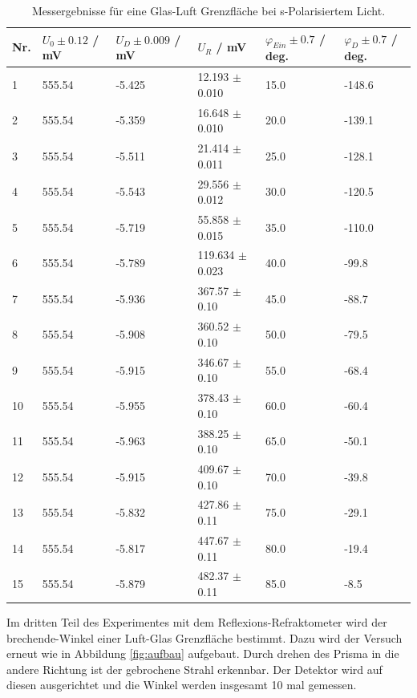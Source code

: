 \documentclass[12pt,a4paper,twoside]{article}
\begin{document}
\begin{table}[H]
    \centering
    \caption{Messergebnisse für eine Glas-Luft Grenzfläche bei s-Polarisiertem Licht. }
    \label{tab:mess glas luft s-pol}
    \begin{tabular}{| l | l | l | l | l | l |}
        \hline
        Nr. & $U_0 \pm 0.12 $ / mV & $U_D \pm 0.009$ / mV & $U_{R}$ / mV & $\varphi_{Ein} \pm 0.7$ / deg. & $\varphi_D \pm 0.7$ / deg.  \\
        \hline
        1  & 555.54 & -5.425 & 12.193  $\pm$ 0.010 & 15.0  & -148.6 \\
        2  & 555.54 & -5.359 & 16.648  $\pm$ 0.010& 20.0  & -139.1 \\
        3  & 555.54 & -5.511 & 21.414  $\pm$ 0.011 & 25.0  & -128.1 \\
        4  & 555.54 & -5.543 & 29.556  $\pm$ 0.012 & 30.0  & -120.5 \\
        5  & 555.54 & -5.719 & 55.858  $\pm$ 0.015 & 35.0  & -110.0 \\
        6  & 555.54 & -5.789 & 119.634 $\pm$ 0.023 & 40.0  & -99.8  \\
        7  & 555.54 & -5.936 & 367.57  $\pm$ 0.10 & 45.0  & -88.7  \\
        8  & 555.54 & -5.908 & 360.52  $\pm$ 0.10 & 50.0  & -79.5  \\
        9  & 555.54 & -5.915 & 346.67  $\pm$ 0.10 & 55.0  & -68.4  \\
        10 & 555.54 & -5.955 & 378.43  $\pm$ 0.10 & 60.0  & -60.4  \\
        11 & 555.54 & -5.963 & 388.25  $\pm$ 0.10 & 65.0 & -50.1  \\
        12 & 555.54 & -5.915 & 409.67  $\pm$ 0.10 & 70.0 & -39.8  \\
        13 & 555.54 & -5.832 & 427.86  $\pm$ 0.11 & 75.0 & -29.1  \\
        14 & 555.54 & -5.817 & 447.67  $\pm$ 0.11 & 80.0 & -19.4  \\
        15 & 555.54 & -5.879 & 482.37  $\pm$ 0.11 & 85.0 & -8.5   \\
        \hline
    \end{tabular}
\end{table}

\noindent
Im dritten Teil des Experimentes mit dem Reflexions-Refraktometer wird der brechende-Winkel einer Luft-Glas Grenzfläche bestimmt. 
Dazu wird der Versuch erneut wie in Abbildung \ref{fig:aufbau} aufgebaut. Durch drehen des Prisma in die andere Richtung ist der gebrochene Strahl erkennbar. 
Der Detektor wird auf diesen ausgerichtet und die Winkel werden insgesamt 10 mal gemessen. 
\end{document}
